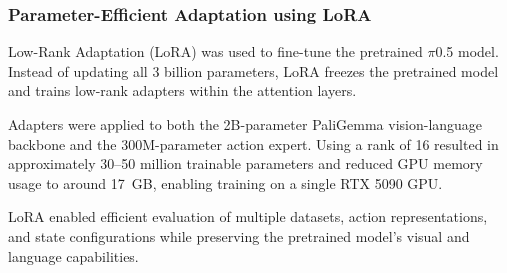 \documentclass[conference, 12pt]{IEEEtran}
\begin{document}
\subsubsection{Parameter-Efficient Adaptation using LoRA}

Low-Rank Adaptation (LoRA) was used to fine-tune the pretrained $\pi$0.5 model. Instead of updating all 3 billion parameters, LoRA freezes the pretrained model and trains low-rank adapters within the attention layers.

Adapters were applied to both the 2B-parameter PaliGemma vision-language backbone and the 300M-parameter action expert. Using a rank of 16 resulted in approximately 30--50 million trainable parameters and reduced GPU memory usage to around 17~GB, enabling training on a single RTX 5090 GPU.

LoRA enabled efficient evaluation of multiple datasets, action representations, and state configurations while preserving the pretrained model's visual and language capabilities.









\end{document}
